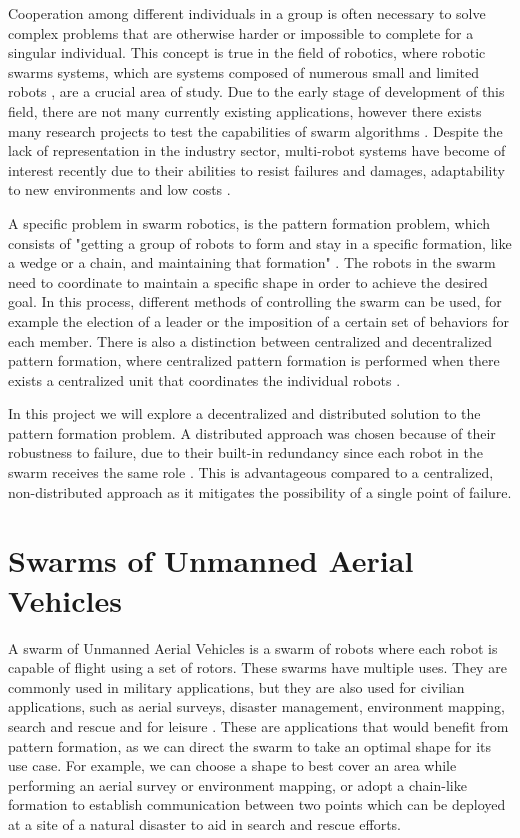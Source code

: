 Cooperation among different individuals in a group is often necessary to solve complex problems
that are otherwise harder or impossible to complete for a singular individual. This concept is
true in the field of robotics, where robotic swarms systems, which are systems composed of
numerous small and limited robots \autocite{HO17}, are a crucial area of study. Due to the early
stage of development of this field, there are not many currently existing applications, however
there exists many research projects to test the capabilities of swarm algorithms \autocite{MS20}.
Despite the lack of representation in the industry sector, multi-robot systems have become of
interest recently due to their abilities to resist failures and damages, adaptability to new
environments and low costs \autocite{HO17}.

A specific problem in swarm robotics, is the pattern formation problem, which consists of
"getting a group of robots to form and stay in a specific formation, like a wedge or a chain,
and maintaining that formation" \autocite{LS22}. The robots in the swarm need to coordinate
to maintain a specific shape in order to achieve the desired goal. In this process, different
methods of controlling the swarm can be used, for example the election of a leader or the 
imposition of a certain set of behaviors for each member. There is also a 
distinction between centralized and decentralized pattern formation, where centralized pattern
formation is performed when there exists a centralized unit that coordinates the individual
robots \autocite{HO17}.

In this project we will explore a decentralized and distributed solution to the pattern formation problem.
A distributed approach was chosen because of their robustness to failure, due to their
built-in redundancy since each robot in the swarm receives the same role \autocite{HO17}.
This is advantageous compared to a centralized, non-distributed approach as it
mitigates the possibility of a single point of failure.


\section{Swarms of Unmanned Aerial Vehicles}

A swarm of Unmanned Aerial Vehicles is a swarm of robots where each robot is capable of flight using
a set of rotors. These swarms have multiple uses. They are commonly used in military applications, but
they are also used for civilian applications, such as aerial surveys, disaster management, environment
mapping, search and rescue and for leisure \autocite{TA19}. These are applications that would benefit
from pattern formation, as we can direct the swarm to take an optimal shape for its use case. For 
example, we can choose a shape to best cover an area while performing an aerial survey or environment
mapping, or adopt a chain-like formation to establish communication between two points \autocite{MS20}
which can be deployed at a site of a natural disaster to aid in search and rescue efforts.


